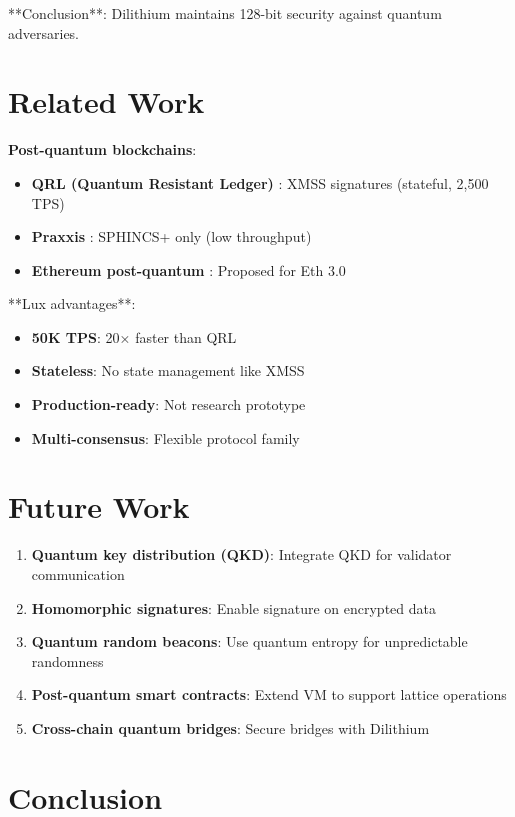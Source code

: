 \documentclass[11pt,letterpaper]{article}
\begin{document}
**Conclusion**: Dilithium maintains 128-bit security against quantum adversaries.

\section{Related Work}

\textbf{Post-quantum blockchains}:
\begin{itemize}
    \item \textbf{QRL (Quantum Resistant Ledger)} \cite{qrl2018}: XMSS signatures (stateful, 2,500 TPS)
    \item \textbf{Praxxis} \cite{praxxis2020}: SPHINCS+ only (low throughput)
    \item \textbf{Ethereum post-quantum} \cite{ethereum2023}: Proposed for Eth 3.0
\end{itemize}

**Lux advantages**:
\begin{itemize}
    \item \textbf{50K TPS}: 20× faster than QRL
    \item \textbf{Stateless}: No state management like XMSS
    \item \textbf{Production-ready}: Not research prototype
    \item \textbf{Multi-consensus}: Flexible protocol family
\end{itemize}

\section{Future Work}

\begin{enumerate}
    \item \textbf{Quantum key distribution (QKD)}: Integrate QKD for validator communication
    \item \textbf{Homomorphic signatures}: Enable signature on encrypted data
    \item \textbf{Quantum random beacons}: Use quantum entropy for unpredictable randomness
    \item \textbf{Post-quantum smart contracts}: Extend VM to support lattice operations
    \item \textbf{Cross-chain quantum bridges}: Secure bridges with Dilithium
\end{enumerate}

\section{Conclusion}
\end{document}
